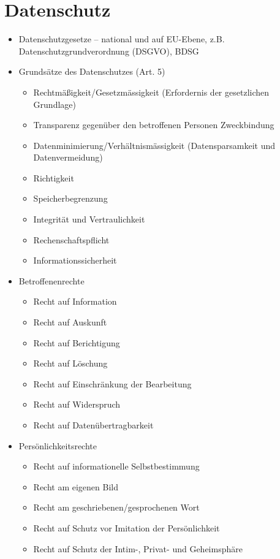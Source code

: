 \section{Datenschutz}
\label{sec:Datenschutz}


\begin{itemize}
	\item Datenschutzgesetze – national und auf EU-Ebene, z.B. Datenschutzgrundverordnung (DSGVO), BDSG
	\item Grundsätze des Datenschutzes (Art. 5)
	\begin{itemize}
		\item Rechtmäßigkeit/Gesetzmässigkeit (Erfordernis der gesetzlichen Grundlage)
		\item Transparenz gegenüber den betroffenen Personen
		Zweckbindung
		\item Datenminimierung/Verhältnismässigkeit (Datensparsamkeit und Datenvermeidung)
		\item Richtigkeit
		\item Speicherbegrenzung
		\item Integrität und Vertraulichkeit
		\item Rechenschaftspflicht
		\item Informationssicherheit
	\end{itemize}
	\item Betroffenenrechte
	\begin{itemize}
		\item Recht auf Information
		\item Recht auf Auskunft
		\item Recht auf Berichtigung
		\item Recht auf Löschung
		\item Recht auf Einschränkung der Bearbeitung
		\item Recht auf Widerspruch
		\item Recht auf Datenübertragbarkeit
	\end{itemize}
	\item Persönlichkeitsrechte
	\begin{itemize}
		\item Recht auf informationelle Selbstbestimmung
		\item Recht am eigenen Bild
		\item Recht am geschriebenen/gesprochenen Wort
		\item Recht auf Schutz vor Imitation der Persönlichkeit
		\item Recht auf Schutz der Intim-, Privat- und Geheimsphäre
	\end{itemize}
\end{itemize}